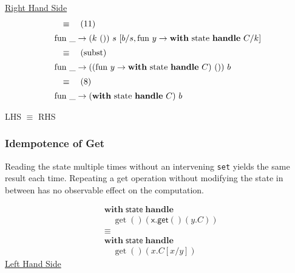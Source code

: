 \documentclass[logo,bsc,singlespacing,parskip]{infthesis}
\begin{document}
\underline{Right Hand Side}
\[ 
\begin{array}{l}
\quad\equiv\quad (11) \\[5pt]
\text{fun }\_ \rightarrow (k\ ())\ s\ [b/s, \text{fun } y \rightarrow \text{\textbf{with} state \textbf{handle} } C/k] \\[5pt]
\quad\equiv\quad (\text{subst}) \\[5pt]
\text{fun }\_ \rightarrow ((\text{fun } y \rightarrow \text{\textbf{with} state \textbf{handle} } C)\ ())\ b \\[5pt]
\quad\equiv\quad (8) \\[5pt]
\text{fun }\_ \rightarrow (\text{\textbf{with} state \textbf{handle} } C)\ b
\end{array}
\]

LHS $\equiv$ RHS

\subsubsection*{Idempotence of Get}
Reading the state multiple times without an intervening \lstinline{set} yields the same result each time. Repeating a get operation without modifying the state in between has no observable effect on the computation.


\[
\begin{aligned}
    &\mathsf{\textbf{with}} \; \mathsf{state} \; \mathsf{\textbf{handle}} \\
    &\quad \operatorname{get}() \left( \mathsf{x.get}() \left( y.C \right) \right) \\
    &\equiv \\
    &\mathsf{\textbf{with}} \; \mathsf{state} \; \mathsf{\textbf{handle}} \\
    &\quad \operatorname{get}() \left( x.C[x/y] \right)
\end{aligned}
\]
\underline{Left Hand Side}
\end{document}
